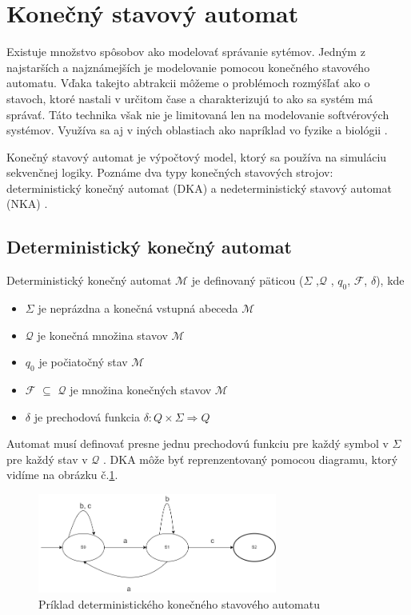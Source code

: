 \section{Konečný stavový automat}
\noindent Existuje množstvo spôsobov ako modelovať správanie sytémov. Jedným z 
najstarších a najznámejších je modelovanie pomocou konečného stavového automatu.
Vďaka takejto abtrakcii môžeme o problémoch rozmýšľať ako o stavoch, ktoré nastali v určitom čase a charakterizujú to ako sa systém má správať. Táto technika však nie je limitovaná len na modelovanie softvérových systémov. Využíva sa aj v iných oblastiach ako napríklad vo fyzike a biológii \cite{WaybackMachine2014}. \par 
Konečný stavový automat je výpočtový model, ktorý sa používa na simuláciu sekvenčnej logiky. Poznáme dva typy konečných stavových strojov: deterministický konečný automat (DKA)  a nedeterministický stavový automat (NKA) \cite{FiniteStateMachines}. 

\subsection{Deterministický konečný automat}
\noindent Deterministický konečný automat $\mathcal{M}$ je definovaný päticou ($\Sigma$ ,$\mathcal{Q}$ , $q_0$, $\mathcal{F}$, $\delta$), kde
\begin{itemize}
    \item $\Sigma$ je neprázdna a konečná vstupná abeceda $\mathcal{M}$
    \item $\mathcal{Q}$ je konečná množina stavov $\mathcal{M}$
    \item $q_0$ je počiatočný stav $\mathcal{M}$
    \item $\mathcal{F}$ $\subseteq$ $\mathcal{Q}$ je množina konečných stavov $\mathcal{M}$
    \item $\delta$ je prechodová funkcia  \begin{math}\delta : Q \times \Sigma \Rightarrow Q\end{math}
\end{itemize}

Automat musí definovať presne jednu prechodovú funkciu pre každý symbol v $\Sigma$ pre každý stav v $\mathcal{Q}$ \cite{FiniteStateMachines}. DKA môže byť reprenzentovaný pomocou diagramu, ktorý vidíme na obrázku č.\ref{figure:dfa1}.

\begin{figure}[h]
    \centering
    \includegraphics[width=0.70\textwidth]{img/dfa.png}
    \caption{Príklad deterministického konečného stavového automatu}
    \label{figure:dfa1}
\end{figure}

